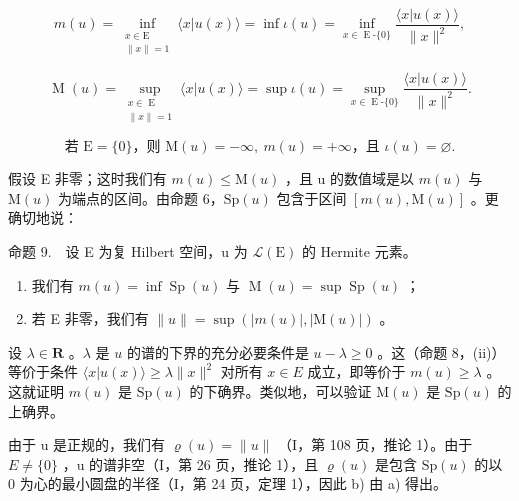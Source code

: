 \[
m(u) = \inf_{\substack{x\in \mathrm{E}\\ \| x\| = 1}}\langle x|u(x)\rangle = \inf \iota (u) = \inf_{x\in \operatorname{E}\text{-}\{0\}}\frac{\langle x|u(x)\rangle}{\|x\|^ {2}},
\]

\[
\operatorname{M}(u) = \sup_{\substack{x\in \operatorname{E}\\ \| x\| = 1}}\langle x|u(x)\rangle = \sup \iota (u) = \sup_{x\in \operatorname{E}\text{-}\{0\}}\frac{\langle x|u(x)\rangle}{\|x\|^ {2}}.
\]

\[
\text{若 } \mathrm{E} = \{0\}\text{，则 } \mathrm{M}(u) = -\infty,\ m(u) = +\infty\text{，且 } \iota(u) = \varnothing.
\]

假设 E 非零；这时我们有 \(m(u) \leqslant \mathrm{M}(u)\) ，且 u 的数值域是以 \(m(u)\) 与 \(\mathrm{M}(u)\) 为端点的区间。由命题 6，\(\mathrm{Sp}(u)\) 包含于区间 \([m(u), \mathrm{M}(u)]\) 。更确切地说：

命题 9.　设 E 为复 Hilbert 空间，u 为 \(\mathcal{L}(\mathrm{E})\) 的 Hermite 元素。

\begin{enumerate}
\def\labelenumi{\alph{enumi})}
\item
  我们有 \(m(u) = \inf \operatorname{Sp}(u)\) 与 \(\operatorname{M}(u) = \sup \operatorname{Sp}(u)\) ；
\item
  若 E 非零，我们有 \(\|u\|=\sup(|m(u)|,|\mathrm{M}(u)|)\) 。
\end{enumerate}

设 \(\lambda \in \mathbf{R}\) 。\(\lambda\) 是 \(u\) 的谱的下界的充分必要条件是 \(u - \lambda \geqslant 0\) 。这（命题 8，(ii)）等价于条件 \(\langle x|u(x)\rangle \geqslant \lambda \|x\|^2\) 对所有 \(x \in E\) 成立，即等价于 \(m(u) \geqslant \lambda\) 。这就证明 \(m(u)\) 是 \(\mathrm{Sp}(u)\) 的下确界。类似地，可以验证 \(\mathrm{M}(u)\) 是 \(\mathrm{Sp}(u)\) 的上确界。

由于 u 是正规的，我们有 \(\varrho(u)=\|u\|\) （I，第 108 页，推论 1）。由于 \(E\neq\{0\}\) ，u 的谱非空（I，第 26 页，推论 1），且 \(\varrho(u)\) 是包含 \(\mathrm{Sp}(u)\) 的以 0 为心的最小圆盘的半径（I，第 24 页，定理 1），因此 b) 由 a) 得出。

